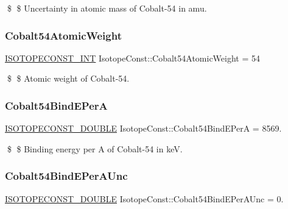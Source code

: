 \$ \$ Uncertainty in atomic mass of Cobalt-\/54 in amu. \mbox{\label{group___isotope_const-_cobalt-_co54_ga1110cc20dc4a57d43c7eca903986067c}} 
\subsubsection{\texorpdfstring{Cobalt54\+Atomic\+Weight}{Cobalt54AtomicWeight}}
{\footnotesize\ttfamily \mbox{\hyperlink{group___isotope_const-_macros_ga5f18360b3e99483a35c32d789e62621c}{I\+S\+O\+T\+O\+P\+E\+C\+O\+N\+S\+T\+\_\+\+I\+NT}} Isotope\+Const\+::\+Cobalt54\+Atomic\+Weight = 54}

\$ \$ Atomic weight of Cobalt-\/54. \mbox{\label{group___isotope_const-_cobalt-_co54_ga73f0d97758936d445b349c5c3ea08e1d}} 
\subsubsection{\texorpdfstring{Cobalt54\+Bind\+E\+PerA}{Cobalt54BindEPerA}}
{\footnotesize\ttfamily \mbox{\hyperlink{group___isotope_const-_macros_ga8f45a7272ce02c0b4c65c44636ed719a}{I\+S\+O\+T\+O\+P\+E\+C\+O\+N\+S\+T\+\_\+\+D\+O\+U\+B\+LE}} Isotope\+Const\+::\+Cobalt54\+Bind\+E\+PerA = 8569.}

\$ \$ Binding energy per A of Cobalt-\/54 in keV. \mbox{\label{group___isotope_const-_cobalt-_co54_ga364c55c0fcf447f436af1b0210d0d5de}} 
\subsubsection{\texorpdfstring{Cobalt54\+Bind\+E\+Per\+A\+Unc}{Cobalt54BindEPerAUnc}}
{\footnotesize\ttfamily \mbox{\hyperlink{group___isotope_const-_macros_ga8f45a7272ce02c0b4c65c44636ed719a}{I\+S\+O\+T\+O\+P\+E\+C\+O\+N\+S\+T\+\_\+\+D\+O\+U\+B\+LE}} Isotope\+Const\+::\+Cobalt54\+Bind\+E\+Per\+A\+Unc = 0.}

